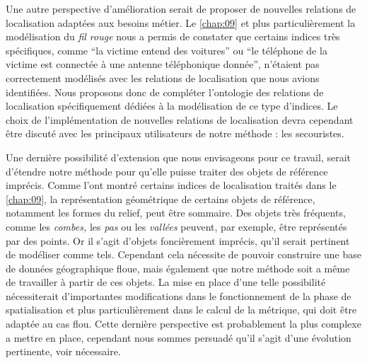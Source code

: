 Une autre perspective d'amélioration serait de proposer de nouvelles
relations de localisation adaptées aux besoins métier. Le
\autoref{chap:09} et plus particulièrement la modélisation du
\emph{fil rouge} nous a permis de constater que certains indices très
spécifiques, comme \enquote{la victime entend des voitures} ou
\enquote{le téléphone de la victime est connectée à une antenne
  téléphonique donnée}, n'étaient pas correctement modélisés avec les
relations de localisation que nous avions identifiées. Nous proposons
donc de compléter l'ontologie des relations de localisation
spécifiquement dédiées à la modélisation de ce type d'indices. Le
choix de l'implémentation de nouvelles relations de localisation devra
cependant être discuté avec les principaux utilisateurs de notre
méthode : les secouristes.

Une dernière possibilité d'extension que nous envisageons pour ce
travail, serait d'étendre notre méthode pour qu'elle puisse traiter
des objets de référence imprécis. Comme l'ont montré certains indices
de localisation traités dans le \autoref{chap:09}, la représentation
géométrique de certains objets de référence, notamment les formes du
relief, peut être sommaire. Des objets très fréquents, comme les
\emph{combes,} les \emph{pas} ou les \emph{vallées} peuvent, par
exemple, être représentés par des points. Or il s'agit d'objets
foncièrement imprécis, qu'il serait pertinent de modéliser comme
tels. Cependant cela nécessite de pouvoir construire une base de
données géographique floue, mais également que notre méthode soit a
même de travailler à partir de ces objets. La mise en place d'une
telle possibilité nécessiterait d'importantes modifications dans le
fonctionnement de la phase de spatialisation et plus particulièrement
dans le calcul de la métrique, qui doit être adaptée au cas
flou. Cette dernière perspective est probablement la plus complexe a
mettre en place, cependant nous sommes persuadé qu'il s'agit d'une
évolution pertinente, voir nécessaire.


